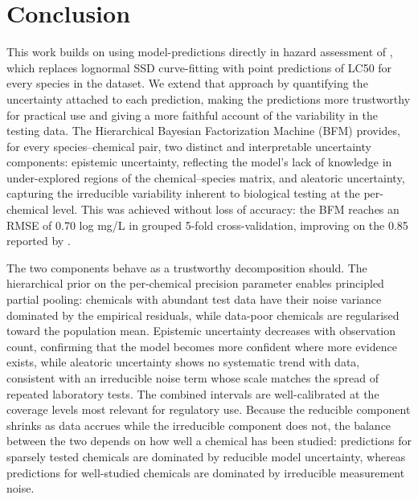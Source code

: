 \section{Conclusion}

This work builds on using model-predictions directly in hazard assessment of \citet{PosthumaImprovingHazard}, which replaces lognormal SSD curve-fitting with point predictions of LC50 for every species in the dataset. We extend that approach by quantifying the uncertainty attached to each prediction, making the predictions more trustworthy for practical use and giving a more faithful account of the variability in the testing data. The Hierarchical Bayesian Factorization Machine (BFM) provides, for every species--chemical pair, two distinct and interpretable uncertainty components: epistemic uncertainty, reflecting the model's lack of knowledge in under-explored regions of the chemical--species matrix, and aleatoric uncertainty, capturing the irreducible variability inherent to biological testing at the per-chemical level. This was achieved without loss of accuracy: the BFM reaches an RMSE of 0.70 log mg/L in grouped 5-fold cross-validation, improving on the 0.85 reported by \citet{PosthumaImprovingHazard}.

The two components behave as a trustworthy decomposition should. The hierarchical prior on the per-chemical precision parameter enables principled partial pooling: chemicals with abundant test data have their noise variance dominated by the empirical residuals, while data-poor chemicals are regularised toward the population mean. Epistemic uncertainty decreases with observation count, confirming that the model becomes more confident where more evidence exists, while aleatoric uncertainty shows no systematic trend with data, consistent with an irreducible noise term whose scale matches the spread of repeated laboratory tests. The combined intervals are well-calibrated at the coverage levels most relevant for regulatory use. Because the reducible component shrinks as data accrues while the irreducible component does not, the balance between the two depends on how well a chemical has been studied: predictions for sparsely tested chemicals are dominated by reducible model uncertainty, whereas predictions for well-studied chemicals are dominated by irreducible measurement noise.

